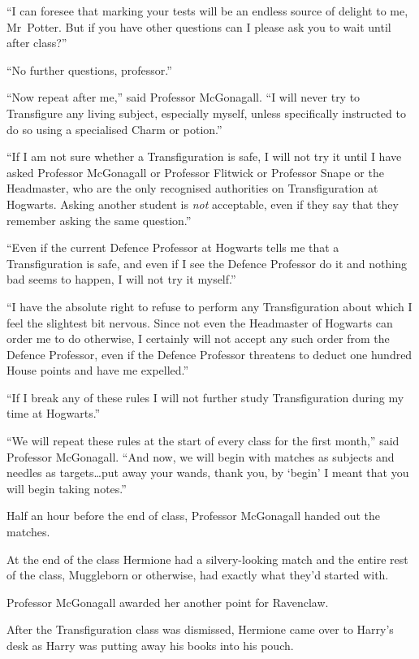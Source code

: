 “I can foresee that marking your tests will be an endless source of delight to
me, Mr~Potter. But if you have other questions can I please ask you to wait
until after class?”

“No further questions, professor.”

“Now repeat after me,” said Professor McGonagall. “I will never try to
Transfigure any living subject, especially myself, unless specifically
instructed to do so using a specialised Charm or potion.”

“If I am not sure whether a Transfiguration is safe, I will not try it until I
have asked Professor McGonagall or Professor Flitwick or Professor Snape or the
Headmaster, who are the only recognised authorities on Transfiguration at
Hogwarts. Asking another student is \emph{not} acceptable, even if they say
that they remember asking the same question.”

“Even if the current Defence Professor at Hogwarts tells me that a
Transfiguration is safe, and even if I see the Defence Professor do it and
nothing bad seems to happen, I will not try it myself.”

“I have the absolute right to refuse to perform any Transfiguration about which
I feel the slightest bit nervous. Since not even the Headmaster of Hogwarts can
order me to do otherwise, I certainly will not accept any such order from the
Defence Professor, even if the Defence Professor threatens to deduct one
hundred House points and have me expelled.”

“If I break any of these rules I will not further study Transfiguration during
my time at Hogwarts.”

“We will repeat these rules at the start of every class for the first month,”
said Professor McGonagall. “And now, we will begin with matches as subjects and
needles as targets…put away your wands, thank you, by ‘begin’ I meant
that you will begin taking notes.”

Half an hour before the end of class, Professor McGonagall handed out the
matches.

At the end of the class Hermione had a silvery-looking match and the entire
rest of the class, Muggleborn or otherwise, had exactly what they’d started
with.

Professor McGonagall awarded her another point for Ravenclaw.

\later

After the Transfiguration class was dismissed, Hermione came over to Harry’s
desk as Harry was putting away his books into his pouch.

